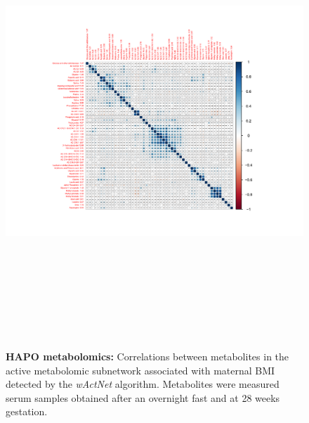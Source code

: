 	\begin{figure}[!hbt]
				\centering
				\includegraphics[height=17cm,width=16cm]{corr_fasting_e.pdf}
				
				\caption{{\bf HAPO metabolomics:} Correlations between metabolites in the active metabolomic subnetwork associated with maternal BMI detected by the {\it wActNet} algorithm. Metabolites were measured serum samples obtained after an overnight fast and at 28 weeks gestation.}
				\label{fig:plotmod21}
			\end{figure} 
